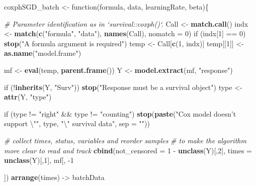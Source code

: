\documentclass[]{article}
\newenvironment{Shaded}{\begin{snugshade}}{\end{snugshade}}
\newcommand{\KeywordTok}[1]{\textcolor[rgb]{0.13,0.29,0.53}{\textbf{{#1}}}}
\newcommand{\DataTypeTok}[1]{\textcolor[rgb]{0.13,0.29,0.53}{{#1}}}
\newcommand{\DecValTok}[1]{\textcolor[rgb]{0.00,0.00,0.81}{{#1}}}
\newcommand{\CharTok}[1]{\textcolor[rgb]{0.31,0.60,0.02}{{#1}}}
\newcommand{\StringTok}[1]{\textcolor[rgb]{0.31,0.60,0.02}{{#1}}}
\newcommand{\CommentTok}[1]{\textcolor[rgb]{0.56,0.35,0.01}{\textit{{#1}}}}
\newcommand{\NormalTok}[1]{{#1}}
\begin{document}
\begin{Shaded}
\begin{Highlighting}[]
\NormalTok{coxphSGD_batch <-}\StringTok{ }\NormalTok{function(formula, data, learningRate, beta)\{}
  
  \CommentTok{# Parameter identification as in  `survival::coxph()`.}
  \NormalTok{Call <-}\StringTok{ }\KeywordTok{match.call}\NormalTok{()}
  \NormalTok{indx <-}\StringTok{ }\KeywordTok{match}\NormalTok{(}\KeywordTok{c}\NormalTok{(}\StringTok{"formula"}\NormalTok{, }\StringTok{"data"}\NormalTok{),}
                \KeywordTok{names}\NormalTok{(Call), }\DataTypeTok{nomatch =} \DecValTok{0}\NormalTok{)}
  \NormalTok{if (indx[}\DecValTok{1}\NormalTok{] ==}\StringTok{ }\DecValTok{0}\NormalTok{) }
      \KeywordTok{stop}\NormalTok{(}\StringTok{"A formula argument is required"}\NormalTok{)}
  \NormalTok{temp <-}\StringTok{ }\NormalTok{Call[}\KeywordTok{c}\NormalTok{(}\DecValTok{1}\NormalTok{, indx)]}
  \NormalTok{temp[[}\DecValTok{1}\NormalTok{]] <-}\StringTok{ }\KeywordTok{as.name}\NormalTok{(}\StringTok{"model.frame"}\NormalTok{)}
  
  \NormalTok{mf <-}\StringTok{ }\KeywordTok{eval}\NormalTok{(temp, }\KeywordTok{parent.frame}\NormalTok{())}
  \NormalTok{Y <-}\StringTok{ }\KeywordTok{model.extract}\NormalTok{(mf, }\StringTok{"response"}\NormalTok{)}
  
  \NormalTok{if (!}\KeywordTok{inherits}\NormalTok{(Y, }\StringTok{"Surv"}\NormalTok{)) }
      \KeywordTok{stop}\NormalTok{(}\StringTok{"Response must be a survival object"}\NormalTok{)}
  \NormalTok{type <-}\StringTok{ }\KeywordTok{attr}\NormalTok{(Y, }\StringTok{"type"}\NormalTok{)}
  
  \NormalTok{if (type !=}\StringTok{ "right"} \NormalTok{&&}\StringTok{ }\NormalTok{type !=}\StringTok{ "counting"}\NormalTok{) }
      \KeywordTok{stop}\NormalTok{(}\KeywordTok{paste}\NormalTok{(}\StringTok{"Cox model doesn't support }\CharTok{\textbackslash{}"}\StringTok{"}\NormalTok{, type, }\StringTok{"}\CharTok{\textbackslash{}"}\StringTok{ survival data"}\NormalTok{, }
          \DataTypeTok{sep =} \StringTok{""}\NormalTok{))}
  
  \CommentTok{# collect times, status, variables and reorder samples }
  \CommentTok{# to make the algorithm more clear to read and track}
  \KeywordTok{cbind}\NormalTok{(}\DataTypeTok{not_censored =} \DecValTok{1} \NormalTok{-}\StringTok{ }\KeywordTok{unclass}\NormalTok{(Y)[,}\DecValTok{2}\NormalTok{],}
        \DataTypeTok{times =} \KeywordTok{unclass}\NormalTok{(Y)[,}\DecValTok{1}\NormalTok{],}
        \NormalTok{mf[, -}\DecValTok{1}\NormalTok{]) %>%}
\StringTok{    }\KeywordTok{arrange}\NormalTok{(times) ->}\StringTok{ }\NormalTok{batchData}
  
}
\end{Highlighting}
\end{Shaded}
\end{document}
